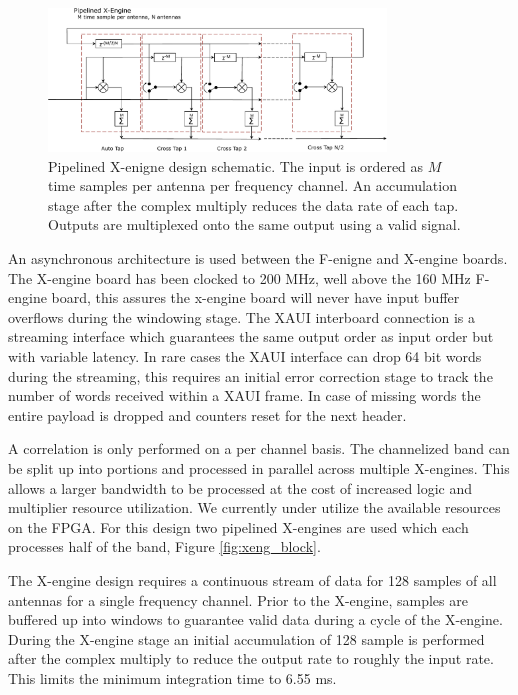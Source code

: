 \documentclass[useAMS,macros,usenatbib]{mn2e}
\begin{document}
\begin{figure}
    \centering
    \includegraphics[width=0.8\textwidth]{graphics/crop_pipelined_xeng.pdf}
    \caption{Pipelined X-enigne design schematic.
    The input is ordered as $M$ time samples per antenna per frequency channel.
    An accumulation stage after the complex multiply reduces the data rate of each tap.
    Outputs are multiplexed onto the same output using a valid signal.}
    \label{fig:xeng_pipe}
\end{figure}

An asynchronous architecture is used between the F-enigne and X-engine boards.
The X-engine board has been clocked to 200 MHz, well above the 160 MHz F-engine board, this assures the x-engine board will never have input buffer overflows during the windowing stage.
The XAUI interboard connection is a streaming interface which guarantees the same output order as input order but with variable latency.
In rare cases the XAUI interface can drop 64 bit words during the streaming, this requires an initial error correction stage to track the number of words received within a XAUI frame.
In case of missing words the entire payload is dropped and counters reset for the next header.

A correlation is only performed on a per channel basis.
The channelized band can be split up into portions and processed in parallel across multiple X-engines.
This allows a larger bandwidth to be processed at the cost of increased logic and multiplier resource utilization.
We currently under utilize the available resources on the FPGA.
For this design two pipelined X-engines are used which each processes half of the band, Figure \ref{fig:xeng_block}.

The X-engine design requires a continuous stream of data for 128 samples of all antennas for a single frequency channel.
Prior to the X-engine, samples are buffered up into windows to guarantee valid data during a cycle of the X-engine.
During the X-engine stage an initial accumulation of 128 sample is performed after the complex multiply to reduce the output rate to roughly the input rate.
This limits the minimum integration time to 6.55 ms.
\end{document}
